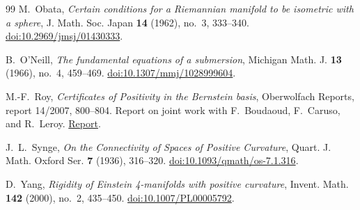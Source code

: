 \begin{thebibliography}{99}
M.~Obata, \emph{Certain conditions for a Riemannian manifold to be isometric with a sphere},
J. Math. Soc. Japan \textbf{14} (1962), no.~3, 333--340.
\href{https://doi.org/10.2969/jmsj/01430333}{doi:10.2969/jmsj/01430333}.

B.~O'Neill, \emph{The fundamental equations of a submersion}, Michigan Math. J. \textbf{13} (1966), no.~4, 459--469.
\href{https://doi.org/10.1307/mmj/1028999604}{doi:10.1307/mmj/1028999604}.

M.-F.~Roy, \emph{Certificates of Positivity in the Bernstein basis}, Oberwolfach Reports, report 14/2007, 800--804. Report on joint work with F.~Boudaoud, F.~Caruso, and R.~Leroy. \href{https://ems.press/content/serial-article-files/46100}{Report}.

J.~L.~Synge, \emph{On the Connectivity of Spaces of Positive Curvature}, Quart. J. Math. Oxford Ser. \textbf{7} (1936), 316--320.
\href{https://doi.org/10.1093/qmath/os-7.1.316}{doi:10.1093/qmath/os-7.1.316}.

D.~Yang, \emph{Rigidity of Einstein 4-manifolds with positive curvature}, Invent. Math. \textbf{142} (2000), no.~2, 435--450.
\href{https://doi.org/10.1007/PL00005792}{doi:10.1007/PL00005792}.

\end{thebibliography}
